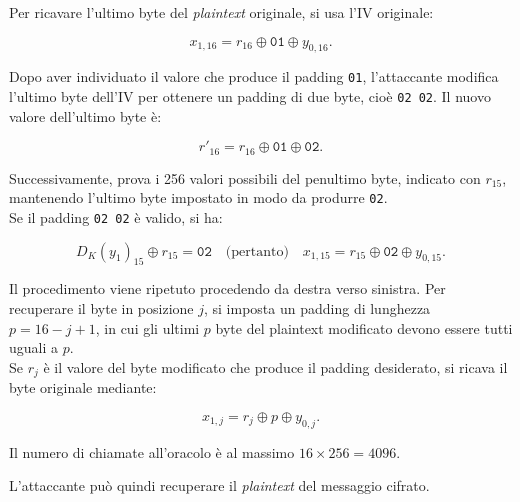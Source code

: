 \noindent Per ricavare l'ultimo byte del \textit{plaintext} originale, si usa l'IV originale:

\[
    \boxed{
    x_{1,16} =
    r_{16} \oplus \texttt{01} \oplus y_{0,16}
    }.
\]

\vspace{0.5em}
\noindent Dopo aver individuato il valore che produce il padding
\texttt{01}, l'attaccante modifica l'ultimo byte dell'IV
per ottenere un padding di due byte, cioè
\texttt{02 02}. Il nuovo valore dell'ultimo byte è:

\[
    r'_{16} =
    r_{16} \oplus \texttt{01} \oplus \texttt{02}.
\]

\noindent Successivamente, prova i 256 valori possibili del penultimo
byte, indicato con $r_{15}$, mantenendo l'ultimo byte impostato
in modo da produrre \texttt{02}.\\ Se il padding \texttt{02 02} è valido,
si ha:

\[
    D_K(y_1)_{15} \oplus r_{15} = \texttt{02} \quad \text{(pertanto)} \quad x_{1,15} = r_{15} \oplus \texttt{02} \oplus y_{0,15}.
\]


\vspace{0.5em}
\noindent Il procedimento viene ripetuto procedendo da destra verso
sinistra. Per recuperare il byte in posizione $j$, si imposta
un padding di lunghezza $p=16-j+1$, in cui gli ultimi $p$
byte del plaintext modificato devono essere tutti uguali a $p$. \\ Se $r_j$ è il valore del byte modificato che produce il padding
desiderato, si ricava il byte originale mediante:

\[
    \boxed{
    x_{1,j} = r_j \oplus p \oplus y_{0,j}
    }.
\]


\vspace{0.2cm} \noindent Il numero di chiamate all'oracolo è al massimo $16 \times 256=4096$. 

\vspace{0.2cm} \noindent L'attaccante può quindi recuperare il \emph{plaintext} del messaggio cifrato.




